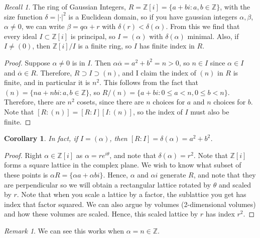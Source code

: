\documentclass[12pt]{article}
\newtheorem{cor}[thm]{Corollary}
\theoremstyle{definition}
\theoremstyle{remark}
\newtheorem{rmk}[thm]{Remark}
\newtheorem*{rec}{Recall}
\numberwithin{equation}{section}
\newcommand\Z{\mathbb Z}    %
\begin{document}
\begin{rec}
        The ring of Gaussian Integers, $R = \Z[i] = \{a+bi:a,b \in \Z\}$, with the size function $\delta = |\cdot|^2$ is a Euclidean domain, so if you have gaussian integers $\alpha,\beta$, $\alpha \neq 0$, we can write $\beta = q\alpha + r$ with $\delta(r) < \delta(\alpha)$. From this we find that every ideal $I \subset \Z[i]$ is principal, so $I=(\alpha)$ with $\delta(\alpha)$ minimal. Also, if $I \neq (0)$, then $\Z[i]/I$ is a finite ring, so $I$ has finite index in $R$.
\end{rec}
\begin{proof}
        Suppose $\alpha \neq 0$ is in $I$. Then $\alpha\overline{\alpha} = a^2 + b^2 = n > 0$, so $n \in I$ since $\alpha \in I$ and $\overline{\alpha} \in R$. Therefore, $R \supset I \supset (n)$, and I claim the index of $(n)$ in $R$ is finite, and in particular it is $n^2$. This follows from the fact that $(n) = \{na+nbi:a,b \in \Z\}$, so $R/(n) = \{a+bi: 0 \leq a < n, 0 \leq b < n\}$. Therefore, there are $n^2$ cosets, since there are $n$ choices for $a$ and $n$ choices for $b$. Note that $[R:(n)] = [R:I][I:(n)]$, so the index of $I$ must also be finite. 
\end{proof}

\vspace{15pt}

\begin{cor}
        In fact, if $I = (\alpha)$, then $[R:I] = \delta(\alpha) = a^2 + b^2$.
\end{cor}
\begin{proof}
        Right $\alpha \in \Z[i]$ as $\alpha = re^{i\theta}$, and note that $\delta(\alpha) = r^2$. Note that $\Z[i]$ forms a square lattice in the complex plane. We wish to know what subset of these points is $\alpha R = \{\alpha a + \alpha b i\}$. Hence, $\alpha$ and $\alpha i$ generate $R$, and note that they are perpendicular so we will obtain a rectangular lattice rotated by $\theta$ and scaled by $r$. Note that when you scale a lattice by a factor, the sublattice you get has index that factor squared. We can also argue by volumes (2-dimensional volumes) and how these volumes are scaled. Hence, this scaled lattice by $r$ has index $r^2$.
\end{proof}


\vspace{15pt}

\begin{rmk}
        We can see this works when $\alpha = n\in \Z$.
\end{rmk}
\end{document}
